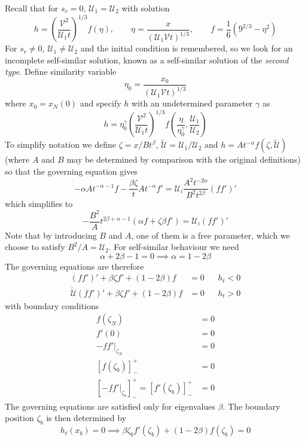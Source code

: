 \documentclass{jknotes}
\newcommand{\dif}[1]{\left[#1\right]^+_-}
\begin{document}
Recall that for $s_r = 0$, $\mathcal{U}_1 = \mathcal{U}_2$ with solution
\begin{equation}
	h = \left( \frac{\mathcal{V}^2}{\mathcal{U}_1 t}\right)^{1/3} f(\eta),
	\hspace{2em} \eta = \frac{x}{(\mathcal{U}_1\mathcal{V}t)^{1/3}},
	\hspace{2em} f = \frac{1}{6}\left( 9^{2/3} - \eta^2\right)
\end{equation}
For $s_r \ne 0$, $\mathcal{U}_1 \ne \mathcal{U}_2$ and the initial condition
is remembered, so we look for an incomplete self-similar solution, known as a
self-similar solution of the \emph{second type}. Define similarity variable
\begin{equation}
	\eta_0 = \frac{x_0}{(\mathcal{U}_1\mathcal{V}t)^{1/3}}
\end{equation}
where $x_0 = x_N(0)$ and specify $h$ with an undetermined parameter $\gamma$ as
\begin{equation}
	h = \eta_0^\gamma \left( \frac{\mathcal{V}^2}{\mathcal{U}_1t}\right)^{1/3}
	f\left(\frac{\eta}{\eta_0^\gamma},\frac{\mathcal{U}_1}{\mathcal{U}_2}\right)
\end{equation}
To simplify notation we define $\zeta = x/Bt^\beta$, $\tilde{\mathcal{U}} =
\mathcal{U}_1/\mathcal{U}_2$ and $h = A t^{-\alpha} f(\zeta,
\tilde{\mathcal{U}})$ (where $A$ and $B$ may be determined by comparison with
the original definitions) so that the governing equation gives
\begin{equation}
	-\alpha A t^{-\alpha-1} f - \frac{\beta \zeta}{t}At^{-\alpha} f' =
	\mathcal{U}_i \frac{A^2 t^{-2\alpha}}{B^2 t^{2\beta}} (ff')'
\end{equation}
which simplifies to
\begin{equation}
	-\frac{B^2}{A} t^{2\beta + \alpha -1} (\alpha f + \zeta \beta f') =
	\mathcal{U}_i(ff')'
\end{equation}
Note that by introducing $B$ and $A$, one of them is a free parameter, which
we choose to satisfy $B^2/A = \mathcal{U}_2$. For self-similar behaviour we
need
\begin{equation}
	\alpha + 2\beta -1 = 0 \implies \alpha = 1 - 2\beta
\end{equation}
The governing equations are therefore
\begin{align}
	(ff')' + \beta \zeta f' + (1-2\beta) f &= 0 && h_t < 0 \\
	\tilde{\mathcal{U}}(ff')' + \beta \zeta f' + (1-2\beta) f &= 0 && h_t > 0
\end{align}
with boundary conditions
\begin{align}
	f(\zeta_N) &= 0 \\
	f'(0) &= 0 \\
	-\left.ff'\right|_{\zeta_N} &= 0 \\
	\dif{f(\zeta_b)} &= 0 \\
	\dif{-\left.ff'\right|_{\zeta_b}} = \dif{f'(\zeta_b)} &= 0 
\end{align}
The governing equations are satisfied only for eigenvalues $\beta$. The
boundary position $\zeta_b$ is then determined by
\begin{equation}
	h_t(x_b) = 0 \implies \beta \zeta_b f'(\zeta_b) + (1-2\beta) f(\zeta_b) =
	0
\end{equation}
\end{document}
